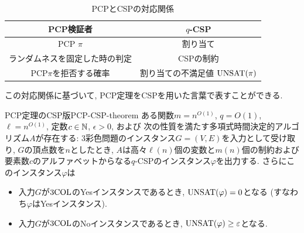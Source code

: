 \begin{table}[htbp]
  \centering
  \begin{tabular}{|c|c|}
    \hline
    PCP検証者 & $q$-CSP \\
    \hline
    PCP $\pi$ & 割り当て \\
    \hline
    ランダムネスを固定した時の判定 & CSPの制約 \\
    \hline
    PCP$\pi$を拒否する確率 & 割り当ての不満足値 $\mathrm{UNSAT}(\pi)$ \\
    \hline
  \end{tabular}
  \caption{PCPとCSPの対応関係}
  \label{table:pcp-csp-correspondence}
\end{table}

この対応関係に基づいて, PCP定理をCSPを用いた言葉で表すことができる.

\begin{theorem}{PCP定理のCSP版}{PCP-CSP-theorem}
  ある関数$m=n^{O(1)}$, $q=O(1)$, $\ell=n^{O(1)}$, 定数$c\in\mathbb{N}$, $\epsilon>0$, および
  次の性質を満たす多項式時間決定的アルゴリズム$A$が存在する:
  3彩色問題のインスタンス$G=(V,E)$を入力として受け取り, $G$の頂点数を$n$としたとき, $A$は高々$\ell(n)$個の変数と$m(n)$個の制約および要素数$c$のアルファベットからなる$q$-CSPのインスタンス$\varphi$を出力する.
  さらにこのインスタンス$\varphi$は
  \begin{itemize}
  \item 入力$G$が$\text{3COL}$のYesインスタンスであるとき, $\mathrm{UNSAT}(\varphi) = 0$となる (すなわち$\varphi$はYesインスタンス).
  \item 入力$G$が$\text{3COL}$のNoインスタンスであるとき, $\mathrm{UNSAT}(\varphi) \ge \varepsilon$となる.
  \end{itemize}
\end{theorem}

